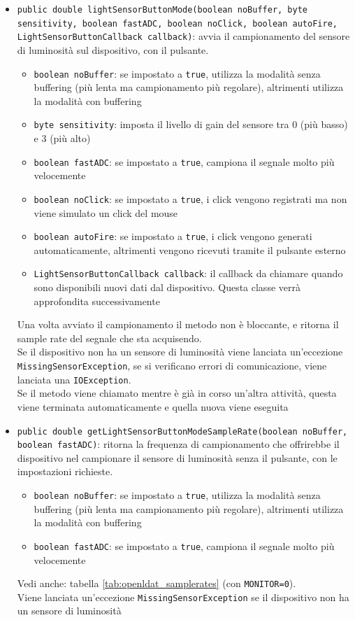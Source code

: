 \begin{itemize}
	\item \texttt{public double lightSensorButtonMode(boolean noBuffer, byte sensitivity, boolean fastADC, boolean noClick, boolean autoFire, LightSensorButtonCallback callback)}: avvia il campionamento del sensore di luminosità sul dispositivo, con il pulsante.\begin{itemize}
		\item \texttt{boolean noBuffer}: se impostato a \texttt{true}, utilizza la modalità senza buffering (più lenta ma campionamento più regolare), altrimenti utilizza la modalità con buffering
		\item \texttt{byte sensitivity}: imposta il livello di gain del sensore tra 0 (più basso) e 3 (più alto)
		\item \texttt{boolean fastADC}: se impostato a \texttt{true}, campiona il segnale molto più velocemente
		\item \texttt{boolean noClick}: se impostato a \texttt{true}, i click vengono registrati ma non viene simulato un click del mouse
		\item \texttt{boolean autoFire}: se impostato a \texttt{true}, i click vengono generati automaticamente, altrimenti vengono ricevuti tramite il pulsante esterno
		\item \texttt{LightSensorButtonCallback callback}: il callback da chiamare quando sono disponibili nuovi dati dal dispositivo. Questa classe verrà approfondita successivamente
	\end{itemize}
	Una volta avviato il campionamento il metodo non è bloccante, e ritorna il sample rate del segnale che sta acquisendo.\\
	Se il dispositivo non ha un sensore di luminosità viene lanciata un'eccezione \texttt{MissingSensorException}, se si verificano errori di comunicazione, viene lanciata una \texttt{IOException}.\\
	Se il metodo viene chiamato mentre è già in corso un'altra attività, questa viene terminata automaticamente e quella nuova viene eseguita
	\item \texttt{public double getLightSensorButtonModeSampleRate(boolean noBuffer, boolean fastADC)}: ritorna la frequenza di campionamento che offrirebbe il dispositivo nel campionare il sensore di luminosità senza il pulsante, con le impostazioni richieste.\begin{itemize}
		\item \texttt{boolean noBuffer}: se impostato a \texttt{true}, utilizza la modalità senza buffering (più lenta ma campionamento più regolare), altrimenti utilizza la modalità con buffering
		\item \texttt{boolean fastADC}: se impostato a \texttt{true}, campiona il segnale molto più velocemente
	\end{itemize}
	Vedi anche: tabella \ref{tab:openldat_samplerates} (con \texttt{MONITOR=0}).\\
	Viene lanciata un'eccezione \texttt{MissingSensorException} se il dispositivo non ha un sensore di luminosità
\end{itemize}

